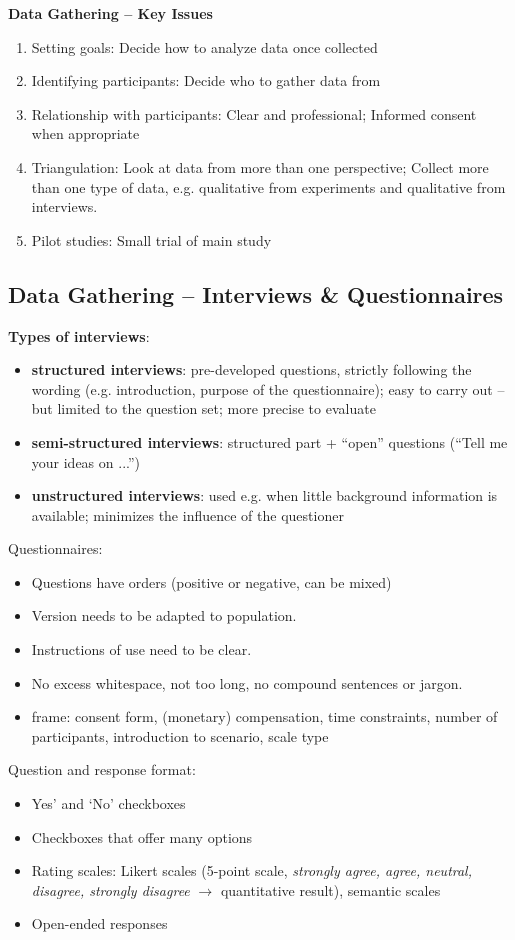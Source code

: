 \textbf{Data Gathering -- Key Issues}
\begin{enumerate}
\item Setting goals: Decide how to analyze data once collected
\item Identifying participants: Decide who to gather data from
\item Relationship with participants: Clear and professional; Informed consent when appropriate
\item Triangulation: Look at data from more than one perspective; Collect more than one type of data, e.g. qualitative from experiments and qualitative from interviews.
\item Pilot studies: Small trial of main study
\end{enumerate}
\subsection{Data Gathering -- Interviews \& Questionnaires}
\textbf{Types of interviews}:
\begin{itemize}
\item \textbf{structured interviews}: pre-developed questions, strictly following the wording (e.g. introduction, purpose of the questionnaire); easy to carry out – but limited to the question set; more precise to evaluate
\item \textbf{semi-structured interviews}: structured part + ``open'' questions (``Tell me your ideas on ...'')
\item \textbf{unstructured interviews}: used e.g. when little background information is available; minimizes the influence of the questioner
\end{itemize}
Questionnaires: 
\begin{itemize}
\item Questions have orders (positive or negative, can be mixed)
\item Version needs to be adapted to population.
\item Instructions of use need to be clear.
\item No excess whitespace, not too long, no compound sentences or jargon.
\item frame: consent form, (monetary) compensation, time constraints, number of participants, introduction to scenario, scale type
\end{itemize}
Question and response format:
\begin{itemize}
\item Yes’ and ‘No’ checkboxes
\item Checkboxes that offer many options
\item Rating scales: Likert scales (5-point scale, \textit{strongly agree, agree, neutral, disagree, strongly disagree} $\rightarrow$ quantitative result), semantic scales
\item Open-ended responses
\end{itemize}
